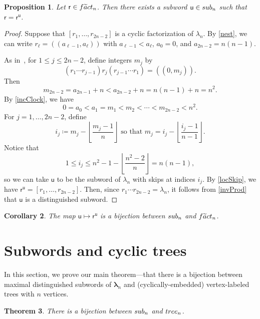 \documentclass[a4paper,10pt,leqno]{amsart}
\numberwithin{equation}{section}
\newtheorem{theorem}{Theorem}[section]
\newtheorem{proposition}[theorem]{Proposition}
\newtheorem{corollary}[theorem]{Corollary}
\theoremstyle{definition}
\theoremstyle{remark}
\renewcommand{\u}{\mathsf{u}}
\newcommand{\T}{\textsc{tree}}
\newcommand{\Ft}{\textsc{f}\widetilde{\textsc{a}}\textsc{ct}}
\renewcommand{\S}{\textsc{sub}}
\newcommand{\E}{\T}
\newcommand{\rr}{\mathsf{r}}
\newcommand{\rru}{\rr^\u}
\newcommand{\rrr}{r}
\newcommand{\blambda}{\bm{\lambda}}
\newcounter{intege}
\begin{document}
\begin{proposition}
Let $\rr \in \Ft_n$.  Then there exists a subword $\u \in \S_n$ such that $\rr=\rru$.
\end{proposition}
\begin{proof}
Suppose that $\left[r_1,\ldots, r_{2n-2}\right]$ is a cyclic factorization of $\lambda_n$.  By \cref{nest}, we can write $r_\ell = (\!(a_{\ell - 1}, a_\ell )\!)$ with $a_{\ell-1} < a_\ell$, $a_0 = 0$, and $a_{2n-2} = n(n-1)$.

As in~, for $1 \leq j \leq 2n-2$, define integers $m_j$ by
\[
        (\rrr_1\cdots \rrr_{j-1})\rrr_j(\rrr_{j-1}\cdots \rrr_1) = (\!(0,m_j)\!).
    \]
Then 
\[
    m_{2n-2} = a_{2n-1} + n < a_{2n-2}+n = n(n-1) + n = n^2.
\]
By \cref{incClock}, we have
\[
    0 = a_0 < a_1 = m_1 < m_2 < \cdots < m_{2n-2} < n^2.
\]
For $j = 1,\dots, 2n-2$, define 
\[
    i_j \coloneqq m_j - \left\lfloor \frac{m_j - 1}{n} \right\rfloor \text{ so that }  m_j = i_j - \left\lfloor \frac{i_j - 1}{n-1}\right\rfloor.
\]
%   
Notice that
\[
    1 \leq i_j \leq n^2 - 1 - \left\lfloor \frac{n^2 - 2}{n}\right\rfloor = n(n-1),
\]
so we can take $\u$ to be the subword of $\lambda_n$ with skips at indices $i_j$. By \cref{locSkip}, we have $\rru = \left[r_1,\dots, r_{2n-2}\right]$. Then, since $r_1 \cdots r_{2n-2} = \lambda_n$, it follows from \cref{invProd} that $\u$ is a distinguished subword.
\end{proof}

\begin{corollary}
The map $\u \mapsto \rru$ is a bijection between $\S_n$ and $\Ft_n$.
\end{corollary}


\section{Subwords and cyclic trees}
\label{sec:bijection}

In this section, we prove our main theorem---that there is a bijection between maximal distinguished subwords of $\blambda_n$ and (cyclically-embedded) vertex-labeled trees with $n$ vertices.

\begin{theorem}
\label{thm:main_thm}
There is a bijection between $\S_n$ and $\E_n$.
\end{theorem}
\end{document}
